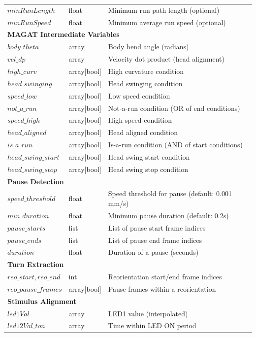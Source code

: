 \documentclass[
  11pt,
]{article}
\begin{document}
\begin{table}[H]
\begin{tabular}{p{3cm}p{2cm}p{9cm}}
$minRunLength$ & float & Minimum run path length (optional) \\
$minRunSpeed$ & float & Minimum average run speed (optional) \\
\hline
\multicolumn{3}{l}{\textbf{MAGAT Intermediate Variables}} \\
\hline
$body\_theta$ & array & Body bend angle (radians) \\
$vel\_dp$ & array & Velocity dot product (head alignment) \\
$high\_curv$ & array[bool] & High curvature condition \\
$head\_swinging$ & array[bool] & Head swinging condition \\
$speed\_low$ & array[bool] & Low speed condition \\
$not\_a\_run$ & array[bool] & Not-a-run condition (OR of end conditions) \\
$speed\_high$ & array[bool] & High speed condition \\
$head\_aligned$ & array[bool] & Head aligned condition \\
$is\_a\_run$ & array[bool] & Is-a-run condition (AND of start conditions) \\
$head\_swing\_start$ & array[bool] & Head swing start condition \\
$head\_swing\_stop$ & array[bool] & Head swing stop condition \\
\hline
\multicolumn{3}{l}{\textbf{Pause Detection}} \\
\hline
$speed\_threshold$ & float & Speed threshold for pause (default: 0.001 mm/s) \\
$min\_duration$ & float & Minimum pause duration (default: 0.2s) \\
$pause\_starts$ & list & List of pause start frame indices \\
$pause\_ends$ & list & List of pause end frame indices \\
$duration$ & float & Duration of a pause (seconds) \\
\hline
\multicolumn{3}{l}{\textbf{Turn Extraction}} \\
\hline
$reo\_start, reo\_end$ & int & Reorientation start/end frame indices \\
$reo\_pause\_frames$ & array[bool] & Pause frames within a reorientation \\
\hline
\multicolumn{3}{l}{\textbf{Stimulus Alignment}} \\
\hline
$led1Val$ & array & LED1 value (interpolated) \\
$led12Val\_ton$ & array & Time within LED ON period \\

\end{tabular}
\end{table}
\end{document}

